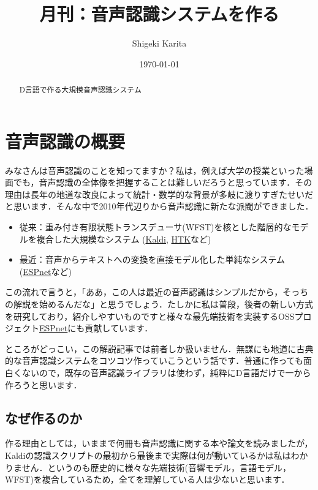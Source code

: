 \documentclass[11pt]{article}
\author{Shigeki Karita}
\date{\today}
\title{月刊：音声認識システムを作る}
\begin{document}
\maketitle
\tableofcontents

\begin{abstract}
\begin{center}
D言語で作る大規模音声認識システム
\end{center}
\end{abstract}


\section{音声認識の概要}
\label{sec:orge5c7b6d}

みなさんは音声認識のことを知ってますか？私は，例えば大学の授業といった場面でも，音声認識の全体像を把握することは難しいだろうと思っています．その理由は長年の地道な改良によって統計・数学的な背景が多岐に渡りすぎたせいだと思います．そんな中で2010年代辺りから音声認識に新たな派閥ができました．

\begin{itemize}
\item 従来：重み付き有限状態トランスデューサ(WFST)\cite{Mohri2008}を核とした階層的なモデルを複合した大規模なシステム\cite{Hori2013} (\href{https://github.com/kaldi-asr/kaldi}{Kaldi}, \href{http://htk.eng.cam.ac.uk/}{HTK}など)
\item 最近：音声からテキストへの変換を直接モデル化した単純なシステム (\href{https://github.com/espnet/espnet}{ESPnet}など)
\end{itemize}

この流れで言うと，「ああ，この人は最近の音声認識はシンプルだから，そっちの解説を始めるんだな」と思うでしょう．たしかに私は普段，後者の新しい方式を研究しており，紹介しやすいものですと様々な最先端技術を実装するOSSプロジェクト\href{https://github.com/espnet/espnet}{ESPnet}にも貢献しています．

ところがどっこい，この解説記事では前者しか扱いません．無謀にも地道に古典的な音声認識システムをコツコツ作っていこうという話です．普通に作っても面白くないので，既存の音声認識ライブラリは使わず，純粋にD言語だけで一から作ろうと思います．

\subsection{なぜ作るのか}
\label{sec:org261a5e0}

作る理由としては，いままで何冊も音声認識に関する本や論文を読みましたが，Kaldiの認識スクリプトの最初から最後まで実際は何が動いているかは私はわかりません．というのも歴史的に様々な先端技術(音響モデル，言語モデル，WFST)を複合しているため，全てを理解している人は少ないと思います．
\end{document}
